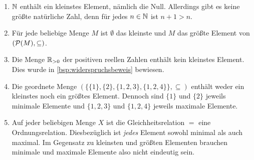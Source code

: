\begin{bsp} \label{bsp:kleinstes} \quad
    \begin{enumerate}
        \item $\mathbb N$ enthält ein kleinstes Element, nämlich die Null. Allerdings gibt es keine größte natürliche Zahl, denn für jedes $n\in \mathbb N$ ist $n+1>n$.
        \item Für jede beliebige Menge $M$ ist $\emptyset$ das kleinste und $M$ das größte Element von $(\mathcal P(M),\subseteq)$.
        \item Die Menge $\mathbb R_{>0}$ der positiven reellen Zahlen enthält kein kleinstes Element. Dies wurde in \cref{bsp:widerspruchsbeweis} bewiesen.
        \item Die geordnete Menge $(\{\{1\},\{2\},\{1,2,3\},\{1,2,4\}\},\subseteq)$ enthält weder ein kleinstes noch ein größtes Element. Dennoch sind $\{1\}$ und $\{2\}$ jeweils minimale Elemente und $\{1,2,3\}$ und $\{1,2,4\}$ jeweils maximale Elemente.
        \item Auf jeder beliebigen Menge $X$ ist die Gleichheitsrelation $=$ eine Ordnungsrelation. Diesbezüglich ist \emph{jedes} Element sowohl minimal als auch maximal. Im Gegensatz zu kleinsten und größten Elementen brauchen minimale und maximale Elemente also nicht eindeutig sein.
    \end{enumerate}
\end{bsp}


